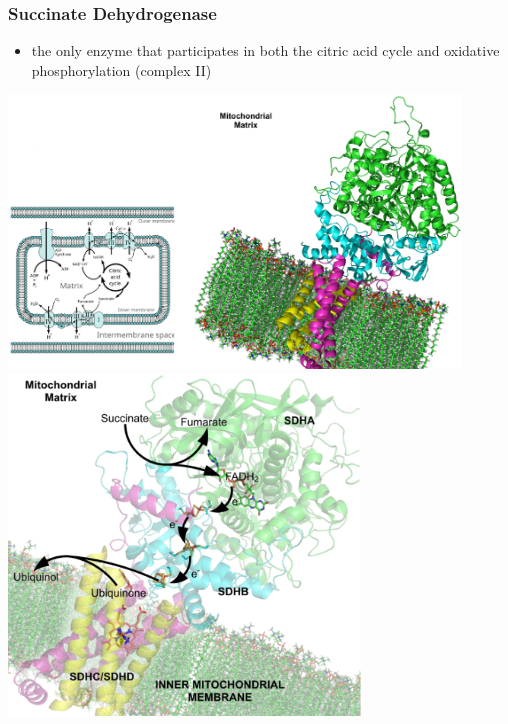 \documentclass[10pt]{article}
\begin{document}
\subsubsection*{Succinate Dehydrogenase}
\begin{itemize}
	\item the only enzyme that participates in both the citric acid cycle and oxidative phosphorylation (complex II)
\end{itemize}
\begin{center} 
	\includegraphics*[width=0.9\textwidth]{L4_15.png} 
    \includegraphics*[width=0.7\textwidth]{L4_16.png} 
\end{center}
\end{document}
